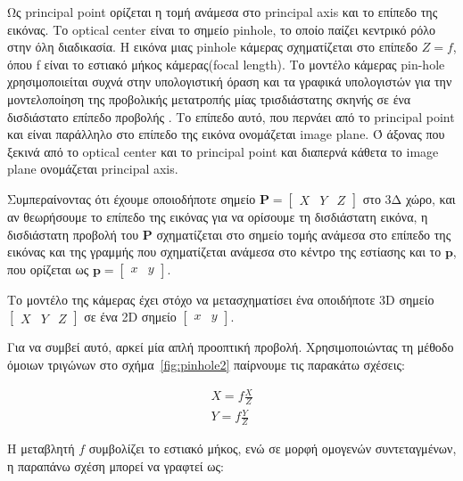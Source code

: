 Ως principal point ορίζεται η τομή ανάμεσα στο principal axis και το επίπεδο της εικόνας. Το optical center είναι το σημείο pinhole, το οποίο παίζει κεντρικό ρόλο στην όλη διαδικασία. Η εικόνα μιας pinhole κάμερας σχηματίζεται στο επίπεδο $Z=f$, όπου f είναι το εστιακό μήκος κάμερας(focal length).
Το μοντέλο κάμερας pin-hole χρησιμοποιείται συχνά στην υπολογιστική όραση και τα γραφικά υπολογιστών για την μοντελοποίηση της προβολικής μετατροπής μίας τρισδιάστατης σκηνής σε ένα δισδιάστατο επίπεδο προβολής \cite{hartley2003multiple} .
Το επίπεδο αυτό, που περνάει από το principal point και είναι παράλληλο στο επίπεδο της εικόνα ονομάζεται image plane.
Ό άξονας που ξεκινά από το optical center και το principal point και διαπερνά κάθετα το image plane ονομάζεται principal axis.


Συμπεραίνοντας ότι έχουμε οποιοδήποτε σημείο $\mathbf{P} = \begin{bmatrix}X & Y &Z\end{bmatrix}$ στο 3Δ χώρο, και αν θεωρήσουμε το επίπεδο της εικόνας για να ορίσουμε τη δισδιάστατη εικόνα, η δισδιάστατη προβολή του $\mathbf{P}$ σχηματίζεται στο σημείο τομής ανάμεσα στο επίπεδο της εικόνας και της γραμμής που σχηματίζεται ανάμεσα στο κέντρο της εστίασης και το $\mathbf{p}$, που ορίζεται ως  $\mathbf{p} = \begin{bmatrix}x & y\end{bmatrix}$. 



Το μοντέλο της κάμερας έχει στόχο να μετασχηματίσει ένα οποιδήποτε 3D σημείο $\begin{bmatrix} X & Y & Z \end{bmatrix}$ σε ένα 2D σημείο $\begin{bmatrix} x & y\end{bmatrix}$. 




Για να συμβεί αυτό, αρκεί μία απλή προοπτική προβολή. Χρησιμοποιώντας τη μέθοδο όμοιων τριγώνων στο σχήμα~\ref{fig:pinhole2} παίρνουμε τις παρακάτω σχέσεις:


\begin{equation}
\begin{aligned}
X=f\frac{X}{Z}\\[0.2cm] 
Y=f\frac{Y}{Z}
\end{aligned}
\end{equation}


Η μεταβλητή $f$ συμβολίζει το εστιακό μήκος, ενώ σε μορφή ομογενών συντεταγμένων, η παραπάνω σχέση μπορεί να γραφτεί ως:

